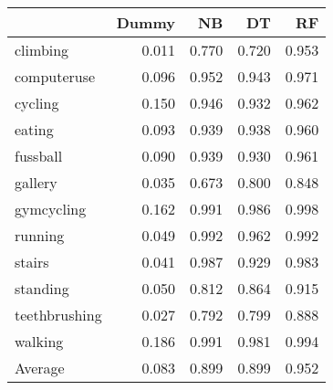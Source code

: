 \begin{tabular}{lrrrr}
\toprule
{} &  Dummy &    NB &    DT &    RF \\
\midrule
climbing      &  0.011 & 0.770 & 0.720 & 0.953 \\
computeruse   &  0.096 & 0.952 & 0.943 & 0.971 \\
cycling       &  0.150 & 0.946 & 0.932 & 0.962 \\
eating        &  0.093 & 0.939 & 0.938 & 0.960 \\
fussball      &  0.090 & 0.939 & 0.930 & 0.961 \\
gallery       &  0.035 & 0.673 & 0.800 & 0.848 \\
gymcycling    &  0.162 & 0.991 & 0.986 & 0.998 \\
running       &  0.049 & 0.992 & 0.962 & 0.992 \\
stairs        &  0.041 & 0.987 & 0.929 & 0.983 \\
standing      &  0.050 & 0.812 & 0.864 & 0.915 \\
teethbrushing &  0.027 & 0.792 & 0.799 & 0.888 \\
walking       &  0.186 & 0.991 & 0.981 & 0.994 \\
Average       &  0.083 & 0.899 & 0.899 & 0.952 \\
\bottomrule
\end{tabular}
